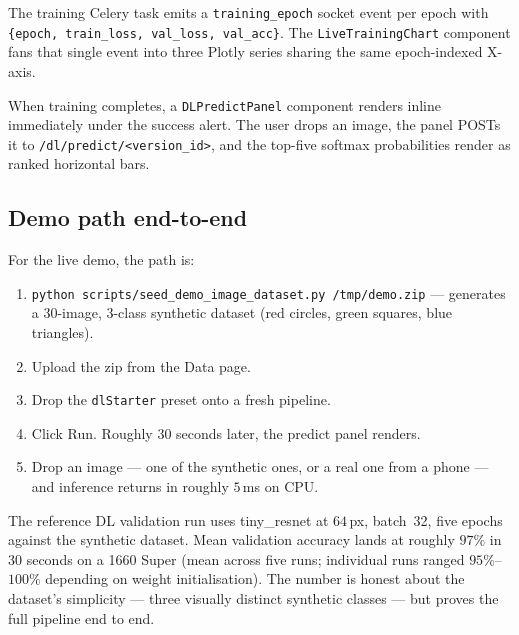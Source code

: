\documentclass[12pt, a4paper, oneside]{report}
\begin{document}
The training Celery task emits a \texttt{training\_epoch} socket
event per epoch with \texttt{\{epoch, train\_loss, val\_loss,
val\_acc\}}. The \texttt{LiveTrainingChart} component fans that
single event into three Plotly series sharing the same epoch-indexed
X-axis.

When training completes, a \texttt{DLPredictPanel} component renders
inline immediately under the success alert. The user drops an image,
the panel POSTs it to \texttt{/dl/predict/<version\_id>}, and the
top-five softmax probabilities render as ranked horizontal bars.


\subsection{Demo path end-to-end}

For the live demo, the path is:

\begin{enumerate}
    \item \texttt{python scripts/seed\_demo\_image\_dataset.py
        /tmp/demo.zip} --- generates a 30-image, 3-class synthetic
        dataset (red circles, green squares, blue triangles).
    \item Upload the zip from the Data page.
    \item Drop the \texttt{dlStarter} preset onto a fresh pipeline.
    \item Click Run. Roughly 30 seconds later, the predict panel
        renders.
    \item Drop an image --- one of the synthetic ones, or a real
        one from a phone --- and inference returns in roughly
        $5$\,ms on CPU.
\end{enumerate}

The reference DL validation run uses tiny\_resnet at $64$\,px,
batch~32, five epochs against the synthetic dataset. Mean validation
accuracy lands at roughly $97\%$ in $30$ seconds on a 1660 Super
(mean across five runs; individual runs ranged $95\%$--$100\%$
depending on weight initialisation). The number is honest about the
dataset's simplicity --- three visually distinct synthetic classes ---
but proves the full pipeline end to end.
\end{document}

